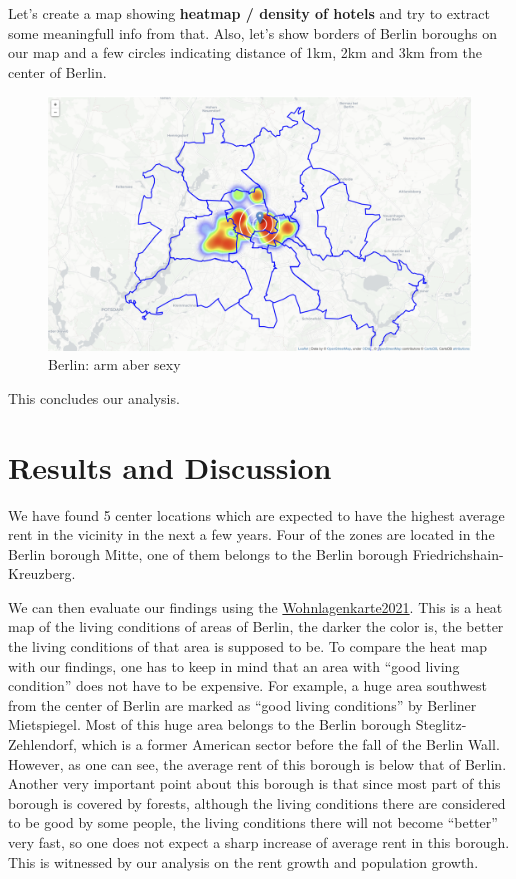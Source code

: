 \documentclass[11pt]{article}
\begin{document}
    Let's create a map showing \textbf{heatmap / density of hotels} and try
to extract some meaningfull info from that. Also, let's show borders of
Berlin boroughs on our map and a few circles indicating distance of 1km,
2km and 3km from the center of Berlin.

     \begin{figure}
\centering
\includegraphics[scale=1.1]{"Screenshot (26).png"}
\caption{Berlin: arm aber sexy}
\end{figure}

        
    This concludes our analysis.

    \hypertarget{results-and-discussion}{%
\section{\texorpdfstring{Results and Discussion
}{Results and Discussion }}\label{results}}

    We have found 5 center locations which are expected to have the highest
average rent in the vicinity in the next a few years. Four of the zones
are located in the Berlin borough Mitte, one of them belongs to the
Berlin borough Friedrichshain-Kreuzberg.

We can then evaluate our findings using the
\href{https://www.stadtentwicklung.berlin.de/wohnen/mietspiegel/de/download/Wohnlagenkarte2021_highdpi.pdf}{Wohnlagenkarte2021}.
This is a heat map of the living conditions of areas of Berlin, the
darker the color is, the better the living conditions of that area is
supposed to be. To compare the heat map with our findings, one has to
keep in mind that an area with ``good living condition'' does not have
to be expensive. For example, a huge area southwest from the center of
Berlin are marked as ``good living conditions'' by Berliner Mietspiegel.
Most of this huge area belongs to the Berlin borough
Steglitz-Zehlendorf, which is a former American sector before the fall
of the Berlin Wall. However, as one can see, the average rent of this
borough is below that of Berlin. Another very important point about this
borough is that since most part of this borough is covered by forests,
although the living conditions there are considered to be good by some
people, the living conditions there will not become ``better'' very
fast, so one does not expect a sharp increase of average rent in this
borough. This is witnessed by our analysis on the rent growth and
population growth.
\end{document}
